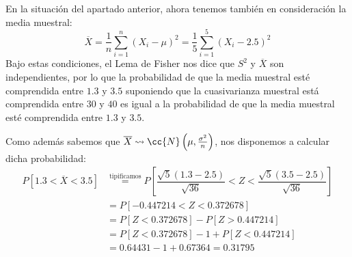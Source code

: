 \begin{ejercicio}
\begin{enumerate}[label=\alph*)]
            En la situación del apartado anterior, ahora tenemos también en consideración la media muestral:
            \begin{equation*}
                \overline{X} = \dfrac{1}{n}\sum_{i=1}^n {(X_i -\mu)}^{2} = \dfrac{1}{5}\sum_{i=1}^{5}{(X_i - 2.5)}^{2}
            \end{equation*}
            Bajo estas condiciones, el Lema de Fisher nos dice que $S^2$ y $\overline{X}$ son independientes, por lo que la probabilidad de que la media muestral esté comprendida entre $1.3$ y $3.5$ suponiendo que la cuasivarianza muestral está comprendida entre $30$ y $40$ es igual a la probabilidad de que la media muestral esté comprendida entre $1.3$ y $3.5$.

            Como además sabemos que $\overline{X}\rightsquigarrow\cc{N}\left(\mu, \frac{\sigma^2}{n}\right)$, nos disponemos a calcular dicha probabilidad:
            \begin{align*}
                P[1.3<\overline{X}<3.5] &\stackrel{\text{tipificamos}}{=} P\left[\dfrac{\sqrt{5}(1.3-2.5)}{\sqrt{36}}< Z < \dfrac{\sqrt{5}(3.5-2.5)}{\sqrt{36}}\right] \\
                                        &= P[-0.447214 < Z < 0.372678] \\ 
                                        &= P[Z<0.372678] - P[Z>0.447214] \\
                                        &= P[Z<0.372678] -1 + P[Z<0.447214] \\
                                        &= 0.64431 - 1 + 0.67364 = 0.31795
            \end{align*}
    \end{enumerate}
\end{ejercicio}

